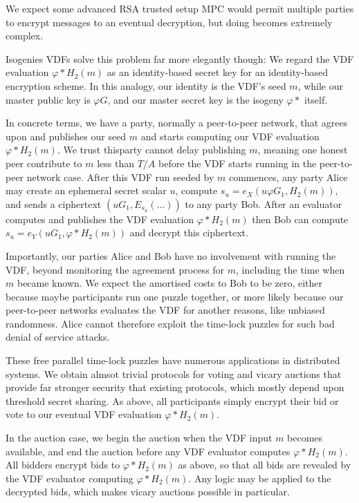 \documentclass{article}
\begin{document}
We expect some advanced RSA trusted setup MPC would permit multiple
parties to encrypt messages to an eventual decryption, but doing 
becomes extremely complex.

Isogenies VDFs solve this problem far more elegantly though:
We regard the VDF evaluation $φ* H_2(m)$ as an identity-based secret
key for an identity-based encryption scheme.  In this analogy, our
identity is the VDF's seed $m$, while our master public key is $φ G$,
and our master secret key is the isogeny $φ*$ itself.

In concrete terms, we have a party, normally a peer-to-peer network,
that agrees upon and publishes our seed $m$ and starts computing our
VDF evaluation $φ* H_2(m)$.  We trust thisparty cannot delay publishing
$m$, meaning one honest peer contribute to $m$ less than $T/A$ before
the VDF starts running in the peer-to-peer network case.
After this VDF run seeded by $m$ commences, any party Alice may create
an ephemeral secret scalar $u$, compute $s_u = e_X ( u φ G_1, H_2(m) )$,
and sends a ciphertext $(u G_1, E_{s_u}(\ldots))$ to any party Bob.
After an evaluator computes and publishes the VDF evaluation
$φ* H_2(m)$ then Bob can compute $s_u = e_Y ( u G_1, φ* H_2(m) )$ and
decrypt this ciphertext.

Importantly, our parties Alice and Bob have no involvement with
running the VDF, beyond monitoring the agreement process for $m$,
including the time when $m$ became known.  We expect the amortised
costs to Bob to be zero, either because maybe participants run one
puzzle together, or more likely because our peer-to-peer networks
evaluates the VDF for another reasons, like unbiased randomness.
Alice cannot therefore exploit the time-lock puzzles for such bad
denial of service attacks.

These free parallel time-lock puzzles have numerous applications in
distributed systems.  We obtain almsot trivial protocols for voting
and vicary auctions that provide far stronger security that existing
protocols, which mostly depend upon threshold secret sharing.
As above, all participants simply encrypt their bid or vote to our
eventual VDF evaluation $φ* H_2(m)$.  

In the auction case, we begin the auction when the VDF input $m$
becomes available, and end the auction before any VDF evaluator
computes $φ* H_2(m)$.  All bidders encrypt bids to $φ* H_2(m)$ as
above, so that all bids are revealed by the VDF evaluator computing
$φ* H_2(m)$.  Any logic may be applied to the decrypted bids,
which makes vicary auctions possible in particular.
\end{document}
